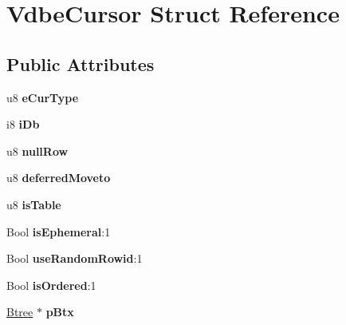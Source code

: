 \hypertarget{struct_vdbe_cursor}{}\section{Vdbe\+Cursor Struct Reference}
\label{struct_vdbe_cursor}
\subsection*{Public Attributes}
\begin{DoxyCompactItemize}
\item 
\mbox{\label{struct_vdbe_cursor_a6128af438b1faa2d175eeb754af1a9c2}} 
u8 {\bfseries e\+Cur\+Type}
\item 
\mbox{\label{struct_vdbe_cursor_ace3e5ef31acdc9bca7b080da2af493a1}} 
i8 {\bfseries i\+Db}
\item 
\mbox{\label{struct_vdbe_cursor_a564d1df8b7bf6df90b1c07c97d7b23ff}} 
u8 {\bfseries null\+Row}
\item 
\mbox{\label{struct_vdbe_cursor_ad6c9d21da881287364a1a3f90285a7e9}} 
u8 {\bfseries deferred\+Moveto}
\item 
\mbox{\label{struct_vdbe_cursor_ab6c2642afb560159a06cffbe7aa98619}} 
u8 {\bfseries is\+Table}
\item 
\mbox{\label{struct_vdbe_cursor_ac13d003d1cf017f3e44897de29a7c2cb}} 
Bool {\bfseries is\+Ephemeral}\+:1
\item 
\mbox{\label{struct_vdbe_cursor_a067fff911d6d37190785a0cf5ba4fc8e}} 
Bool {\bfseries use\+Random\+Rowid}\+:1
\item 
\mbox{\label{struct_vdbe_cursor_a8d9e802372b801c4eb5aef6340cfa21a}} 
Bool {\bfseries is\+Ordered}\+:1
\item 
\mbox{\label{struct_vdbe_cursor_a560873e698d4c6e7d032c069f16834fa}} 
\mbox{\hyperlink{struct_btree}{Btree}} $\ast$ {\bfseries p\+Btx}
\item 
\mbox{\label{struct_vdbe_cursor_a4f11f0befb0dcf16273cc832ca6d92a5}} 

\end{DoxyCompactItemize}
